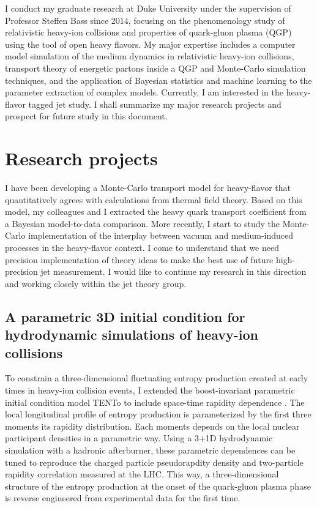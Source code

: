 \documentclass[10pt,a4paper]{article}
\begin{document}
I conduct my graduate research at Duke University under the supervision of Professor Steffen Bass since 2014, focusing on the phenomenology study of relativistic heavy-ion collisions and properties of quark-gluon plasma (QGP) using the tool of open heavy flavors.
My major expertise includes a computer model simulation of the medium dynamics in relativistic heavy-ion collisions, transport theory of energetic partons inside a QGP and Monte-Carlo simulation techniques, and the application of Bayesian statistics and machine learning to the parameter extraction of complex models.
Currently, I am interested in the heavy-flavor tagged jet study.
I shall summarize my major research projects and prospect for future study in this document.


\section{Research projects}
I have been developing a Monte-Carlo transport model for heavy-flavor that quantitatively agrees with calculations from thermal field theory.
Based on this model, my colleagues and I extracted the heavy quark transport coefficient from a Bayesian model-to-data comparison.
More recently, I start to study the Monte-Carlo implementation of the interplay between vacuum and medium-induced processes in the heavy-flavor context.
I come to understand that we need precision implementation of theory ideas to make the best use of future high-precision jet measurement.
I would like to continue my research in this direction and working closely within the jet theory group.

\subsection{A parametric 3D initial condition for hydrodynamic simulations of heavy-ion collisions}
To constrain a three-dimensional fluctuating entropy production created at early times in heavy-ion collision events, I extended the boost-invariant parametric initial condition model T\raisebox{-.25em}{R}ENTo to include space-time rapidity dependence \cite{Ke:2016jrd}. The local longitudinal profile of entropy production is parameterized by the first three moments its rapidity distribution. Each moments depends on the local nuclear participant densities in a parametric way. Using a 3+1D hydrodynamic simulation with a hadronic afterburner, these parametric dependences can be tuned to reproduce the charged particle pseudorapdity density and two-particle rapidity correlation measured at the LHC. This way, a three-dimensional structure of the entropy production at the onset of the quark-gluon plasma phase is reverse engineered from experimental data for the first time. 
\end{document}
